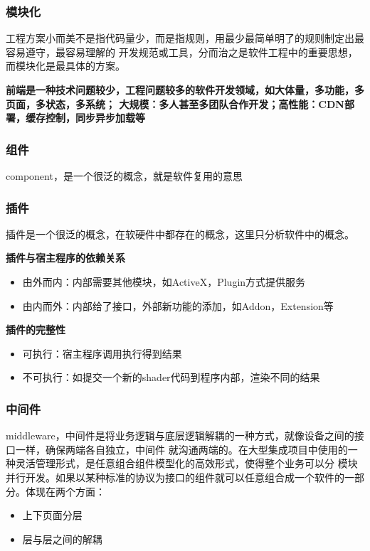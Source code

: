 \subsubsection{模块化}
工程方案小而美不是指代码量少，而是指规则，用最少最简单明了的规则制定出最容易遵守，最容易理解的
开发规范或工具，分而治之是软件工程中的重要思想，而模块化是最具体的方案。

\textbf{前端是一种技术问题较少，工程问题较多的软件开发领域，如大体量，多功能，多页面，多状态，多系统；
大规模：多人甚至多团队合作开发；高性能：CDN部署，缓存控制，同步异步加载等}

\subsubsection{组件}
component，是一个很泛的概念，就是软件复用的意思

\subsubsection{插件}
插件是一个很泛的概念，在软硬件中都存在的概念，这里只分析软件中的概念。

\textbf{插件与宿主程序的依赖关系}
\begin{itemize}
    \item {由外而内：内部需要其他模块，如ActiveX，Plugin方式提供服务}
    \item {由内而外：内部给了接口，外部新功能的添加，如Addon，Extension等}
\end{itemize}

\textbf{插件的完整性}
\begin{itemize}
    \item {可执行：宿主程序调用执行得到结果}
    \item {不可执行：如提交一个新的shader代码到程序内部，渲染不同的结果}
\end{itemize}

\subsubsection{中间件}
middleware，中间件是将业务逻辑与底层逻辑解耦的一种方式，就像设备之间的接口一样，确保两端各自独立，中间件
就沟通两端的。在大型集成项目中使用的一种灵活管理形式，是任意组合组件模型化的高效形式，使得整个业务可以分
模块并行开发。如果以某种标准的协议为接口的组件就可以任意组合成一个软件的一部分。体现在两个方面：
\begin{itemize}
    \item {上下页面分层}
    \item {层与层之间的解耦}
\end{itemize}


